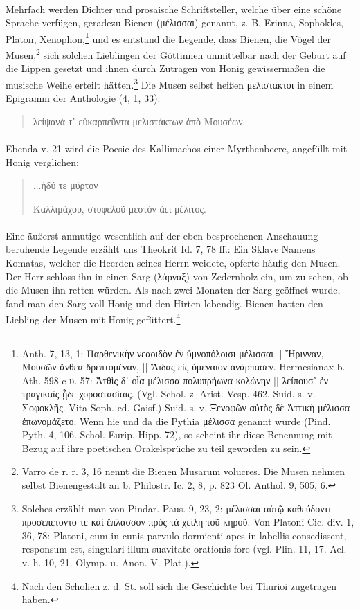 \documentclass[a4paper, 11pt, oneside]{article}
\begin{document}
\paragraph{}
Mehrfach werden Dichter und prosaische Schriftsteller, welche über eine schöne Sprache verfügen, geradezu Bienen (μέλισσαι) genannt, z. B. Erinna, Sophokles, Platon, Xenophon,\footnote{Anth. 7, 13, 1: Παρθενικὴν νεαοιδὸν ἐν ὑμνοπόλοισι μέλισσαι || Ἤρινναν, Μουσῶν ἄνθεα δρεπτομέναν, || Ἅιδας εἰς ὑμέναιον ἀνάρπασεν. Hermesianax b. Ath. 598 c υ. 57: Ἀτθὶς δ᾽ οἷα μέλισσα πολυπρήωνα κολώνην || λείπουσ᾽ ἐν τραγικαὶς ᾖδε χοροστασίαις. (Vgl. Schol. z. Arist. Vesp. 462. Suid. s. v. Σοφοκλῆς. Vita Soph. ed. Gaisf.) Suid. s. v. Ξενοφῶν αὐτὸς δὲ Ἀττικὴ μέλισσα ἐπωνομάζετο. Wenn hie und da die Pythia μέλισσα genannt wurde (Pind. Pyth. 4, 106. Schol. Eurip. Hipp. 72), so scheint ihr diese Benennung mit Bezug auf ihre poetischen Orakelsprüche zu teil geworden zu sein.} und es entstand die Legende, dass Bienen, die Vögel der Musen,\footnote{Varro de r. r. 3, 16 nennt die Bienen Musarum volucres. Die Musen nehmen selbst Bienengestalt an b. Philostr. Ic. 2, 8, p. 823 Ol. Anthol. 9, 505, 6.} sich solchen Lieblingen der Göttinnen unmittelbar nach der Geburt auf die Lippen gesetzt und ihnen durch Zutragen von Honig gewissermaßen die musische Weihe erteilt hätten.\footnote{Solches erzählt man von Pindar. Paus. 9, 23, 2: μέλισσαι αὐτῷ καθεύδοντι προσεπέτοντο τε καὶ ἔπλασσον πρὸς τὰ χείλη τοῦ κηροῦ. Von Platoni Cic. div. 1, 36, 78: Platoni, cum in cunis parvulo dormienti apes in labellis consedissent, responsum est, singulari illum suavitate orationis fore (vgl. Plin. 11, 17. Ael. v. h. 10, 21. Olymp. u. Anon. V. Plat.).} Die Musen selbst heißen μελίστακτοι in einem Epigramm der Anthologie (4, 1, 33):
\begin{quotation}\large
λείψανὰ τ᾽ εὐκαρπεῦντα μελιστάκτων ἀπὸ Μουσέων.
\end{quotation}
\paragraph{}
Ebenda v. 21 wird die Poesie des Kallimachos einer Myrthenbeere, angefüllt mit Honig verglichen:
\begin{quotation}\large
...ἡδύ τε μύρτον

Καλλιμάχου, στυφελοῦ μεστὸν ἀεὶ μέλιτος.
\end{quotation}
\paragraph{}
Eine äußerst anmutige wesentlich auf der eben besprochenen Anschauung beruhende Legende erzählt uns Theokrit Id. 7, 78 ff.: Ein Sklave Namens Komatas, welcher die Heerden seines Herrn weidete, opferte häufig den Musen. Der Herr schloss ihn in einen Sarg (λάρναξ) von Zedernholz ein, um zu sehen, ob die Musen ihn retten würden. Als nach zwei Monaten der Sarg geöffnet wurde, fand man den Sarg voll Honig und den Hirten lebendig. Bienen hatten den Liebling der Musen mit Honig gefüttert.\footnote{Nach den Scholien z. d. St. soll sich die Geschichte bei Thurioi zugetragen haben.}
\end{document}
